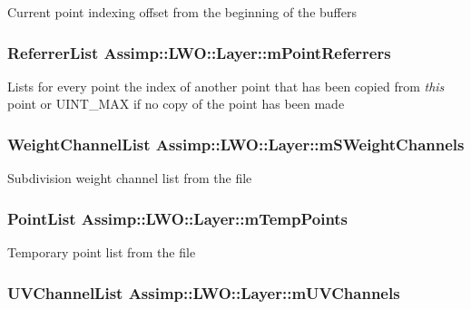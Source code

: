 Current point indexing offset from the beginning of the buffers \hypertarget{struct_assimp_1_1_l_w_o_1_1_layer_ab8b296c432079a0ee835be21ba6abc4f}{
\subsubsection[{m\+Point\+Referrers}]{\setlength{\rightskip}{0pt plus 5cm}Referrer\+List Assimp\+::\+L\+W\+O\+::\+Layer\+::m\+Point\+Referrers}}\label{struct_assimp_1_1_l_w_o_1_1_layer_ab8b296c432079a0ee835be21ba6abc4f}
Lists for every point the index of another point that has been copied from {\itshape this} point or U\+I\+N\+T\+\_\+\+M\+A\+X if no copy of the point has been made \hypertarget{struct_assimp_1_1_l_w_o_1_1_layer_ad7fc10e3e40c6adea77dfeccb833fb61}{
\subsubsection[{m\+S\+Weight\+Channels}]{\setlength{\rightskip}{0pt plus 5cm}Weight\+Channel\+List Assimp\+::\+L\+W\+O\+::\+Layer\+::m\+S\+Weight\+Channels}}\label{struct_assimp_1_1_l_w_o_1_1_layer_ad7fc10e3e40c6adea77dfeccb833fb61}
Subdivision weight channel list from the file \hypertarget{struct_assimp_1_1_l_w_o_1_1_layer_afb5e709f554e9f4bd54bba5e4d91c08e}{
\subsubsection[{m\+Temp\+Points}]{\setlength{\rightskip}{0pt plus 5cm}Point\+List Assimp\+::\+L\+W\+O\+::\+Layer\+::m\+Temp\+Points}}\label{struct_assimp_1_1_l_w_o_1_1_layer_afb5e709f554e9f4bd54bba5e4d91c08e}
Temporary point list from the file \hypertarget{struct_assimp_1_1_l_w_o_1_1_layer_a39ecd29f0e58d8898c9213d7e201b88d}{
\subsubsection[{m\+U\+V\+Channels}]{\setlength{\rightskip}{0pt plus 5cm}U\+V\+Channel\+List Assimp\+::\+L\+W\+O\+::\+Layer\+::m\+U\+V\+Channels}}\label{struct_assimp_1_1_l_w_o_1_1_layer_a39ecd29f0e58d8898c9213d7e201b88d}
